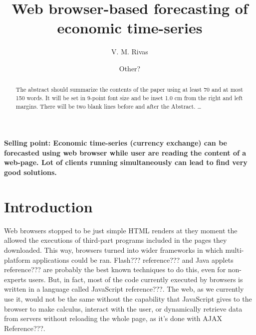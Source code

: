 \documentclass{llncs}
\begin{document}
%
%
\mainmatter              %
%
\title{Web browser-based forecasting of economic time-series}
%
%
\author{
V. M. Rivas 
\and Other?
}
%
%
%

\maketitle              %
\textbf{Selling point: Economic time-series (currency exchange) can be forecasted using web browser while user are reading the content of a web-page. Lot of clients running simultaneously can lead to find very good solutions.}
\begin{abstract}
{\color{red}
The abstract should summarize the contents of the paper
using at least 70 and at most 150 words. It will be set in 9-point
font size and be inset 1.0 cm from the right and left margins.
There will be two blank lines before and after the Abstract. \dots
}
\end{abstract}
%
\section{Introduction}
Web browsers stopped to be just simple HTML renders at they moment the allowed the executions of third-part programs included in the pages they downloaded. This way, browsers turned into wider frameworks in which multi-platform applications could be ran. Flash??? reference??? and Java applets reference??? are probably the best known techniques to do this, even for non-experts users. But, in fact, most of the code currently executed by browsers is written in a language called JavaScript reference???. The web, as we currently use it, would not be the same without the capability that JavaScript gives to the browser to make calculus, interact with the user, or dynamically retrieve data from servers without reloading the whole page, as it's done with AJAX Reference???. 
\end{document}
